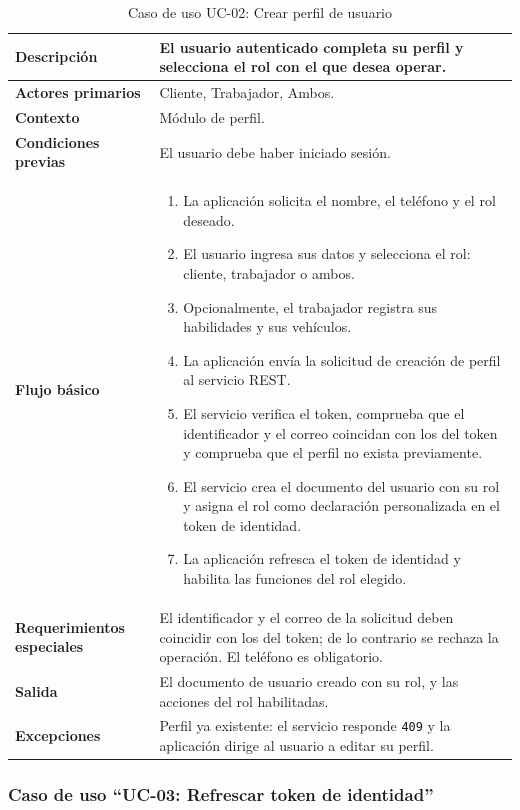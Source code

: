 \documentclass[doc,12pt,a4paper]{apa7}
\begin{document}
\begin{longtable}{|P{3.3cm}|L{11.2cm}|}
\caption{Caso de uso UC-02: Crear perfil de usuario}\\
\hline
\textbf{Descripción} & El usuario autenticado completa su perfil y selecciona el rol con el que desea operar. \\ \hline
\textbf{Actores primarios} & Cliente, Trabajador, Ambos. \\ \hline
\textbf{Contexto} & Módulo de perfil. \\ \hline
\textbf{Condiciones previas} & El usuario debe haber iniciado sesión. \\ \hline
\textbf{Flujo básico} &
\begin{enumerate}
    \item La aplicación solicita el nombre, el teléfono y el rol deseado.
    \item El usuario ingresa sus datos y selecciona el rol: cliente, trabajador o ambos.
    \item Opcionalmente, el trabajador registra sus habilidades y sus vehículos.
    \item La aplicación envía la solicitud de creación de perfil al servicio REST.
    \item El servicio verifica el token, comprueba que el identificador y el correo coincidan con los del token y comprueba que el perfil no exista previamente.
    \item El servicio crea el documento del usuario con su rol y asigna el rol como declaración personalizada en el token de identidad.
    \item La aplicación refresca el token de identidad y habilita las funciones del rol elegido.
\end{enumerate} \\ \hline
\textbf{Requerimientos especiales} & El identificador y el correo de la solicitud deben coincidir con los del token; de lo contrario se rechaza la operación. El teléfono es obligatorio. \\ \hline
\textbf{Salida} & El documento de usuario creado con su rol, y las acciones del rol habilitadas. \\ \hline
\textbf{Excepciones} & Perfil ya existente: el servicio responde \texttt{409} y la aplicación dirige al usuario a editar su perfil. \\ \hline
\end{longtable}

\subsubsection{Caso de uso ``UC-03: Refrescar token de identidad''}
\end{document}
